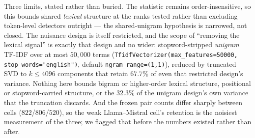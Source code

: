 Three limits, stated rather than buried. The statistic remains order-insensitive, so this bounds shared \emph{lexical} structure at the ranks tested rather than excluding token-level detectors outright --- the shared-unigram hypothesis is narrowed, not closed. The nuisance design is itself restricted, and the scope of ``removing the lexical signal'' is exactly that design and no wider: stopword-stripped \emph{unigram} TF-IDF over at most $50{,}000$ terms (\texttt{TfidfVectorizer(max\_features=50000, stop\_words="english")}, default \texttt{ngram\_range=(1,1)}), reduced by truncated SVD to $k\le4096$ components that retain $67.7\%$ of even that restricted design's variance. Nothing here bounds bigram or higher-order lexical structure, positional or stopword-carried structure, or the $32.3\%$ of the unigram design's own variance that the truncation discards. And the frozen pair counts differ sharply between cells ($822$/$806$/$520$), so the weak Llama--Mistral cell's retention is the noisiest measurement of the three; we flagged that before the numbers existed rather than after.



